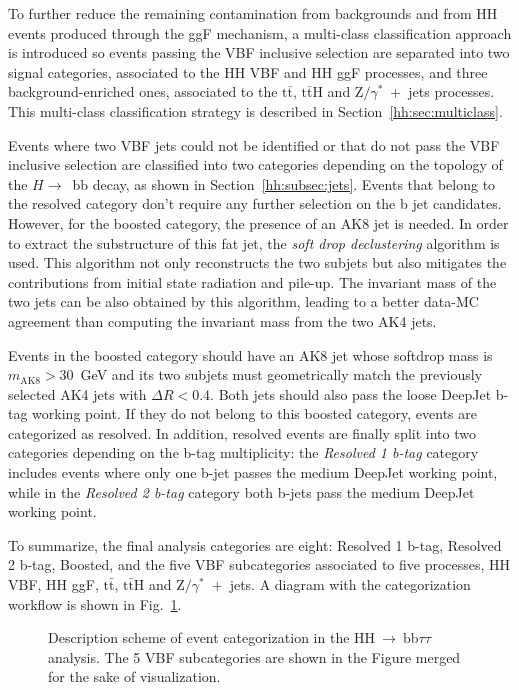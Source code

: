 \documentclass[../main.tex]{subfiles}
\begin{document}
To further reduce the remaining contamination from backgrounds and from HH events produced through the ggF mechanism, a multi-class classification approach is introduced so events passing the VBF inclusive selection are separated into two signal categories, associated to the HH VBF and HH ggF processes, and three background-enriched ones, associated to the $\text{t}\bar{\text{t}}$, $\text{t}\bar{\text{t}}$H and Z$/\gamma^*$~+~jets processes. This multi-class classification strategy is described in Section~\ref{hh:sec:multiclass}.

Events where two VBF jets could not be identified or that do not pass the VBF inclusive selection are classified into two categories depending on the topology of the $H\to$~bb decay, as shown in Section~\ref{hh:subsec:jets}. Events that belong to the resolved category don't require any further selection on the b jet candidates. However, for the boosted category, the presence of an AK8 jet is needed. In order to extract the substructure of this fat jet, the \textit{soft drop declustering} \cite{hh:analysis:softdrop} algorithm is used. This algorithm not only reconstructs the two subjets but also mitigates the contributions from initial state radiation and pile-up. The invariant mass of the two jets can be also obtained by this algorithm, leading to a better data-MC agreement than computing the invariant mass from the two AK4 jets.

Events in the boosted category should have an AK8 jet whose softdrop mass is $m_\text{AK8} > 30$~GeV and its two subjets must geometrically match the previously selected AK4 jets with $\Delta R < 0.4$.  Both jets should also pass the loose DeepJet b-tag working point. If they do not belong to this boosted category, events are categorized as resolved. In addition, resolved events are finally split into two categories depending on the b-tag multiplicity: the \textit{Resolved 1 b-tag} category includes events where only one b-jet passes the medium DeepJet working point, while in the \textit{Resolved 2 b-tag} category both b-jets pass the medium DeepJet working point.

To summarize, the final analysis categories are eight: Resolved 1 b-tag, Resolved 2 b-tag, Boosted, and the five VBF subcategories associated to five processes, HH VBF, HH ggF, $\text{t}\bar{\text{t}}$, $\text{t}\bar{\text{t}}$H and Z$/\gamma^*$~+~jets. A diagram with the categorization workflow is shown in Fig.~\ref{hh:fig:categorization}.

\begin{figure}[h!]
\begin{center}
\end{center}
\caption[\hhbbtt{} categorization scheme]{Description scheme of event categorization in the HH$~\to~$bb$\tau\tau$ analysis. The 5 VBF subcategories are shown in the Figure merged for the sake of visualization.}
\label{hh:fig:categorization}
\end{figure}
\end{document}
